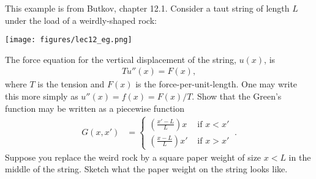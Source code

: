 \begin{exercise}
This example is from Butkov, chapter 12.1. Consider a taut string of length $L$ under the load of a weirdly-shaped rock:
\begin{center}
\texttt{[image: figures/lec12\_eg.png]}
\end{center}
The force equation for the vertical displacement of the string, $u(x)$, is
\begin{align}
	T u''(x) = F(x),
\end{align}
where $T$ is the tension and $F(x)$ is the force-per-unit-length. One may write this more simply as $u''(x) = f(x) = F(x)/T$. Show that the Green's function may be written as a piecewise function
\begin{align}
	G(x,x') &=
	\begin{cases}
	\left(\frac{x'-L}{L}\right)x  & \text{ if } x<x'
	\\
	\left(\frac{x-L}{L}\right)x' & \text{ if } x>x' 
	\end{cases}\ .
\end{align}
Suppose you replace the weird rock by a square paper weight of size $x < L$ in the middle of the string. Sketch what the paper weight on the string looks like.
\end{exercise}